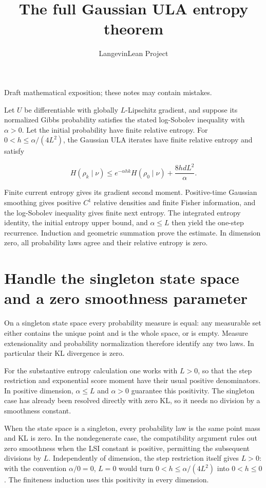\documentclass[11pt,a4paper]{article}
\title{\texorpdfstring{The full Gaussian ULA entropy theorem}{The full Gaussian ULA entropy theorem}}
\author{LangevinLean Project}
\date{}
\begin{document}
\maketitle
Draft mathematical exposition; these notes may contain mistakes.


Let \(U\) be differentiable with globally \(L\)-Lipschitz gradient, and suppose its normalized Gibbs probability satisfies the stated log-Sobolev inequality with \(\alpha>0\). Let the initial probability have finite relative entropy. For \(0<h\le\alpha/(4L^2)\), the Gaussian ULA iterates have finite relative entropy and satisfy

\[H(\rho_k\mid\nu)\le e^{-\alpha hk}H(\rho_0\mid\nu)+\frac{8hdL^2}{\alpha}.\]

Finite current entropy gives its gradient second moment. Positive-time Gaussian smoothing gives positive \(C^1\) relative densities and finite Fisher information, and the log-Sobolev inequality gives finite next entropy. The integrated entropy identity, the initial entropy upper bound, and \(\alpha\le L\) then yield the one-step recurrence. Induction and geometric summation prove the estimate. In dimension zero, all probability laws agree and their relative entropy is zero.


\section{\texorpdfstring{Handle the singleton state space and a zero smoothness parameter}{Handle the singleton state space and a zero smoothness parameter}}


On a singleton state space every probability measure is equal: any measurable set either contains the unique point and is the whole space, or is empty. Measure extensionality and probability normalization therefore identify any two laws. In particular their KL divergence is zero.



For the substantive entropy calculation one works with \(L>0\), so that the step restriction and exponential score moment have their usual positive denominators. In positive dimension, \(\alpha\le L\) and \(\alpha>0\) guarantee this positivity. The singleton case has already been resolved directly with zero KL, so it needs no division by a smoothness constant.



When the state space is a singleton, every probability law is the same point mass and KL is zero. In the nondegenerate case, the compatibility argument rules out zero smoothness when the LSI constant is positive, permitting the subsequent divisions by \(L\). Independently of dimension, the step restriction itself gives \(L>0\): with the convention \(\alpha/0=0\), \(L=0\) would turn \(0<h\le\alpha/(4L^2)\) into \(0<h\le0\). The finiteness induction uses this positivity in every dimension.
\end{document}
